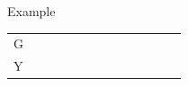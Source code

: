 \documentclass{bredelebeamer}
\begin{document}
\begin{frame}{Example}
\begin{table}[]
\begin{tabular}{lllllllllllll}
\multicolumn{1}{l|}{G}  & \multicolumn{1}{l|}{} & \multicolumn{1}{l|}{} & \multicolumn{1}{l|}{} & \multicolumn{1}{l|}{} & \multicolumn{1}{l|}{} & \multicolumn{1}{l|}{} & \multicolumn{1}{l|}{} & \multicolumn{1}{l|}{} & \multicolumn{1}{l|}{} & \multicolumn{1}{l|}{} & \multicolumn{1}{l|}{} & \multicolumn{1}{l|}{} \\ \cline{2-13} 
\multicolumn{1}{l|}{Y}  & \multicolumn{1}{l|}{} & \multicolumn{1}{l|}{} & \multicolumn{1}{l|}{} & \multicolumn{1}{l|}{} & \multicolumn{1}{l|}{} & \multicolumn{1}{l|}{} & \multicolumn{1}{l|}{} & \multicolumn{1}{l|}{} & \multicolumn{1}{l|}{} & \multicolumn{1}{l|}{} & \multicolumn{1}{l|}{} & \multicolumn{1}{l|}{} \\ \cline{2-13} 
\end{tabular}
\end{table}
  
 \end{frame}
 
\end{document}
